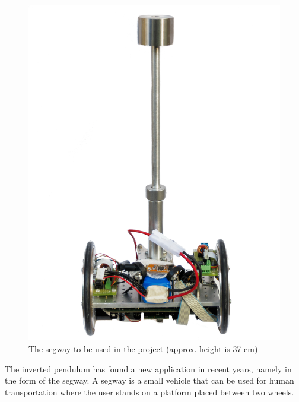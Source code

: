 \begin{figure}[H]
\begin{minipage}{0.40\textwidth}
	\includegraphics[width=\textwidth]{figures/hardwarePlatform.jpg}
	\caption{The segway to be used in the project (approx. height is 37 cm)}
	\label{minisegway}
	\end{minipage}
\end{figure}
\vspace{-3mm}
The inverted pendulum has found a new application in recent years, namely in the form of the segway. A segway is a small vehicle that can be used for human transportation where the user stands on a platform placed between two wheels.


